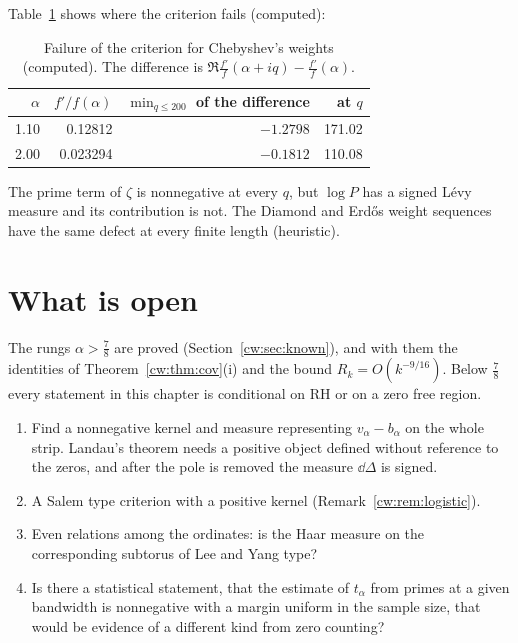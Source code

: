 Table~\ref{cw:tab:chebw} shows where the criterion fails (computed):

\begin{table}[t]
\centering\small
\begin{tabular}{rrrr}
\toprule
$\alpha$ & $f'/f(\alpha)$ & $\min_{q\le200}$ of the difference & at $q$\\
\midrule
1.10 & 0.12812 & $-1.2798$ & 171.02\\
2.00 & 0.023294 & $-0.1812$ & 110.08\\
\bottomrule
\end{tabular}
\caption{Failure of the criterion for Chebyshev's weights (computed). The difference is $\Re\frac{f'}{f}(\alpha+iq)-\frac{f'}{f}(\alpha)$.}
\label{cw:tab:chebw}
\end{table}

The prime term of $\zeta$ is nonnegative at every $q$, but $\log P$ has a signed L\'evy measure and its contribution is not. The Diamond and Erd\H{o}s weight sequences have the same defect at every finite length (heuristic).

\section{What is open}\label{cw:sec:wopen}

The rungs $\alpha>\frac78$ are proved (Section~\ref{cw:sec:known}), and with them the identities of Theorem~\ref{cw:thm:cov}(i) and the bound $R_k=O(k^{-9/16})$. Below $\frac78$ every statement in this chapter is conditional on RH or on a zero free region.

\begin{enumerate}
\item Find a nonnegative kernel and measure representing $v_\alpha-b_\alpha$ on the whole strip. Landau's theorem needs a positive object defined without reference to the zeros, and after the pole is removed the measure $\dd\Delta$ is signed.
\item A Salem type criterion with a positive kernel (Remark~\ref{cw:rem:logistic}).
\item Even relations among the ordinates: is the Haar measure on the corresponding subtorus of Lee and Yang type?
\item Is there a statistical statement, that the estimate of $t_\alpha$ from primes at a given bandwidth is nonnegative with a margin uniform in the sample size, that would be evidence of a different kind from zero counting?
\end{enumerate}
